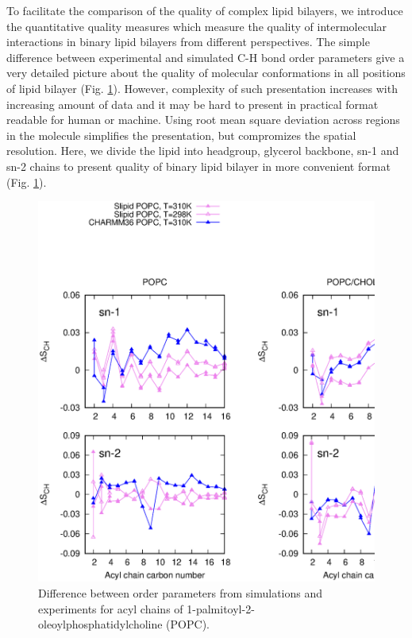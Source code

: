 \documentclass[aps,prl,superscriptaddress,twocolumn]{revtex4}
\begin{document}
To facilitate the comparison of the quality of complex lipid bilayers,
we introduce the quantitative quality measures which measure the quality of
intermolecular interactions in binary lipid bilayers from different perspectives.
The simple difference between experimental and simulated C-H bond order parameters
give a very detailed picture about the quality of molecular conformations in all
positions of lipid bilayer (Fig. \ref{OrderParametersCHOLfitness}).
However, complexity of such presentation increases with increasing amount of data
and it may be hard to present in practical format readable for human or machine.
Using root mean square deviation across regions in the molecule simplifies the presentation,
but compromizes the spatial resolution. Here, we divide the lipid into headgroup, glycerol
backbone, sn-1 and sn-2 chains to present quality of binary lipid bilayer in more convenient
format (Fig. \ref{OrderParametersCHOLfitness}).

\begin{figure}[]
  \centering
  \includegraphics[width=17.2cm]{../FIGS/OrderParametersCHOLfitness.eps}
  \caption{\label{OrderParametersCHOLfitness}
    Difference between order parameters from simulations and experiments for acyl chains of  1-palmitoyl-2-oleoylphosphatidylcholine (POPC).
  }
\end{figure}
\end{document}
